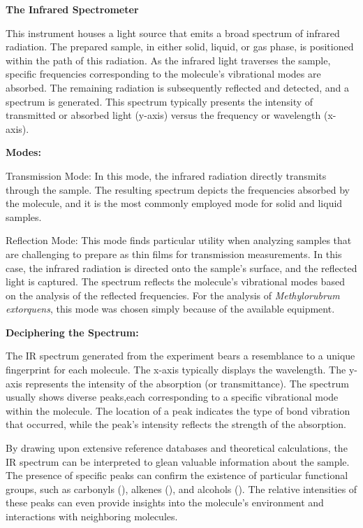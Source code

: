 \textbf{The Infrared Spectrometer}

This instrument houses a light source that emits a broad spectrum of infrared radiation.
The prepared sample, in either solid, liquid, or gas phase, is positioned within the path of this radiation.
As the infrared light traverses the sample, specific frequencies corresponding to the molecule's vibrational modes are absorbed.
The remaining radiation is subsequently reflected and detected, and a spectrum is generated.
This spectrum typically presents the intensity of transmitted or absorbed light (y-axis) versus the frequency or wavelength (x-axis).

\textbf{Modes:}

Transmission Mode: In this mode, the infrared radiation directly transmits through the sample.
The resulting spectrum depicts the frequencies absorbed by the molecule, and it is the most commonly employed mode for solid and liquid samples.

Reflection Mode: This mode finds particular utility when analyzing samples that are challenging to prepare as thin films for transmission measurements.
In this case, the infrared radiation is directed onto the sample's surface, and the reflected light is captured.
The spectrum reflects the molecule's vibrational modes based on the analysis of the reflected frequencies.
For the analysis of \emph{Methylorubrum extorquens}, this mode was chosen simply because of the available equipment.

\textbf{Deciphering the Spectrum:}

The IR spectrum generated from the experiment bears a resemblance to a unique fingerprint for each molecule.
The x-axis typically displays the wavelength.
The y-axis represents the intensity of the absorption (or transmittance).
The spectrum usually shows diverse peaks,each corresponding to a specific vibrational mode within the molecule.
The location of a peak indicates the type of bond vibration that occurred, while the peak's intensity reflects the strength of the absorption.

By drawing upon extensive reference databases and theoretical calculations, the IR spectrum
can be interpreted to glean valuable information about the sample.
The presence of specific peaks can confirm the existence of particular functional groups, such as carbonyls (), alkenes (), and alcohols ().
The relative intensities of these peaks can even provide insights into the molecule's environment and interactions with neighboring molecules.

